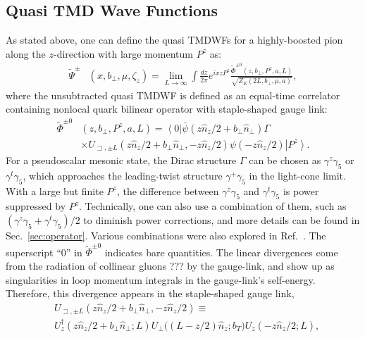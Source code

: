\documentclass[prd,aps,twocolumn,preprintnumbers, showpacs, nofootinbib,superscriptaddress,notitlepage]{revtex4-1}
\newcommand\bl{\color{blue}}
\begin{document}


\subsection{Quasi TMD Wave Functions}
As stated above, one can define the quasi TMDWFs for a highly-boosted pion along the $z$-direction with large momentum $P^z$ as: 
\begin{align}
	\tilde{\Psi}^{\pm}&\left(x,b_{\perp},\mu,\zeta_z\right)=\lim_{L\to\infty}\int\frac{dz}{2\pi}e^{ixzP^z}\frac{\tilde{\Phi}^{\pm0}\left(z,b_{\perp},P^z,a,L\right)}{\sqrt{Z_E(2L,b_{\perp},\mu, a)}},\label{eq:quasiWFinmomentumspace}
\end{align}
where the unsubtracted quasi TMDWF is defined as an equal-time correlator containing nonlocal quark bilinear operator with staple-shaped gauge link:
\begin{align}
	\tilde{\Phi}^{\pm0}&\left(z,b_{\perp},P^z,a,L\right) =\left\langle 0\right|\bar{\psi}\left(z \hat{n}_{z}/2+b_{\perp} \hat{n}_{\perp}\right) \Gamma \nonumber\\
	&\times U_{\sqsupset, \pm L}\left(z \hat{n}_{z}/2+b_{\perp} \hat{n}_{\perp},-z \hat{n}_{z}/2\right) \psi\left(-z \hat{n}_{z}/2\right)\left| P^{z}\right\rangle. \label{eq:quasiWFincoordinatespace}
\end{align}
For a pseudoscalar mesonic state, the Dirac structure $\Gamma$ can be chosen as $\gamma^z\gamma_5$ or $\gamma^t\gamma_5$, which approaches the leading-twist structure $\gamma^+\gamma_5$ in {\bl the} light-cone limit. With a large but finite $P^z$, the difference between $\gamma^z\gamma_5$ and $\gamma^t\gamma_5$  is power suppressed by $P^z$. Technically, one can also use a combination of them, such as $\left(\gamma^z\gamma_5+\gamma^t\gamma_5\right)/2$ to diminish  power corrections, and more details can be found  in Sec.~\ref{sec:operator}.  Various combinations were also explored in Ref.~\cite{Li:2021wvl}.  The {\bl superscript ``0''} in $\tilde{\Phi}^{\pm0}$ indicates bare quantities. The linear divergences come from the radiation of collinear gluons {\bl ??? by} the gauge-link,  and show up as singularities in loop momentum integrals in the gauge-link's self-energy. Therefore, this divergence appears in the staple-shaped gauge link,  
\begin{align}
	&U_{\sqsupset, \pm L}\left(z \hat{n}_{z}/2+b_{\perp} \hat{n}_{\perp},-z \hat{n}_{z}/2\right) \equiv\nonumber\\
	&	U_z^{\dagger}\left(z \hat{n}_{z}/2+b_{\perp} \hat{n}_{\perp}; L \right) U_{\perp}\big((L-z /2)\hat{n}_{z};{b}_T \big) U_z\left( -z \hat{n}_{z}/2; L \right), \label{eq:stapleshapedUlink}
\end{align}
\end{document}

